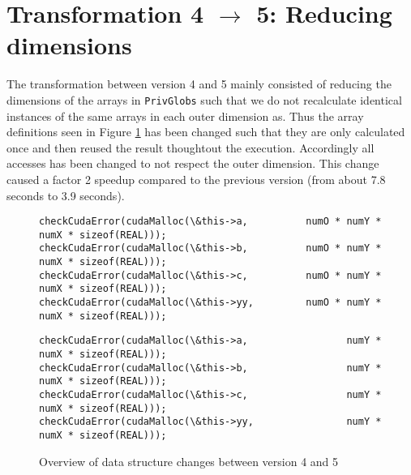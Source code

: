 \section{Transformation 4 $\rightarrow$ 5: Reducing dimensions}
The transformation between version 4 and 5 mainly consisted of reducing the dimensions of the arrays in \texttt{PrivGlobs} such that we do not recalculate identical instances of the same arrays in each outer dimension as.\n
Thus the array definitions seen in Figure \ref{dimreductions} has been changed such that they are only calculated once and then reused the result thoughtout the execution. Accordingly all accesses has been changed to not respect the outer dimension.\n
This change caused a factor 2 speedup compared to the previous version
(from about 7.8 seconds to 3.9 seconds).


\begin{figure}[H]
    \centering
\begin{Verbatim}[label={4\_OuterParallelCuda/ProjHelperFun.h}]
checkCudaError(cudaMalloc(\&this->a,          numO * numY * numX * sizeof(REAL)));
checkCudaError(cudaMalloc(\&this->b,          numO * numY * numX * sizeof(REAL)));
checkCudaError(cudaMalloc(\&this->c,          numO * numY * numX * sizeof(REAL)));
checkCudaError(cudaMalloc(\&this->yy,         numO * numY * numX * sizeof(REAL)));
\end{Verbatim}
\vspace{2mm}
\begin{Verbatim}[label={5\_ReducedCudaDimensions/ProjHelperFun.h}]
checkCudaError(cudaMalloc(\&this->a,                 numY * numX * sizeof(REAL)));
checkCudaError(cudaMalloc(\&this->b,                 numY * numX * sizeof(REAL)));
checkCudaError(cudaMalloc(\&this->c,                 numY * numX * sizeof(REAL)));
checkCudaError(cudaMalloc(\&this->yy,                numY * numX * sizeof(REAL)));
\end{Verbatim}
\caption{Overview of data structure changes between version 4 and 5\label{dimreductions}}
\end{figure}
